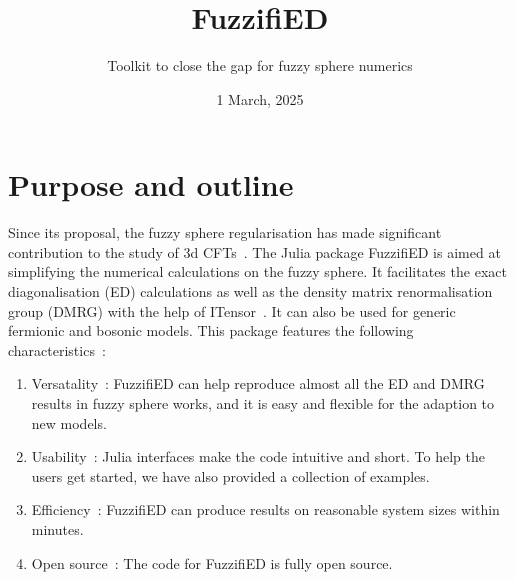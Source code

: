 \documentclass{timesjhep}
\title{FuzzifiED}
\subtitle{Toolkit to close the gap for fuzzy sphere numerics}
\date{1 March, 2025}
\begin{document}
\maketitle

\section{Purpose and outline}

Since its proposal, the fuzzy sphere regularisation has made significant contribution to the study of 3d CFTs~\cite{Zhu2022,Hu2023Mar,Han2023Jun,Zhou2023,Lao2023,Hu2023Aug,Hofmann2023,Han2023Dec,Zhou2024Jan,Hu2024,Cuomo2024,Zhou2024Jul,Dedushenko2024,Fardelli2024,Fan2024,Zhou2024Oct,Voinea2024}. The Julia package FuzzifiED is aimed at simplifying the numerical calculations on the fuzzy sphere. It facilitates the exact diagonalisation (ED) calculations as well as the density matrix renormalisation group (DMRG) with the help of ITensor~\cite{ITensor}. It can also be used for generic fermionic and bosonic models. This package features the following characteristics~: 
\begin{enumerate}
    \item Versatality~: FuzzifiED can help reproduce almost all the ED and DMRG results in fuzzy sphere works, and it is easy and flexible for the adaption to new models. 
    \item Usability~: Julia interfaces make the code intuitive and short. To help the users get started, we have also provided a collection of examples.
    \item Efficiency~: FuzzifiED can produce results on reasonable system sizes within minutes.
    \item Open source~: The code for FuzzifiED is fully open source. 
\end{enumerate}
\end{document}
